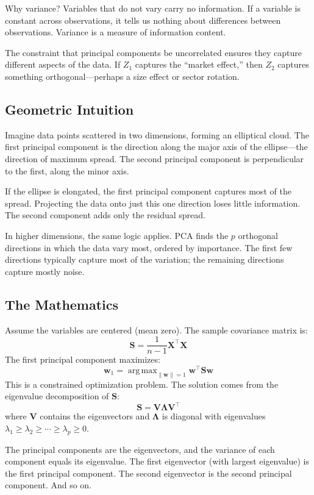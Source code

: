 \documentclass[11pt,a4paper]{article}
\DeclareMathOperator*{\argmax}{arg\,max}
\begin{document}
Why variance? Variables that do not vary carry no information. If a variable is constant across observations, it tells us nothing about differences between observations. Variance is a measure of information content.

The constraint that principal components be uncorrelated ensures they capture different aspects of the data. If $Z_1$ captures the ``market effect,'' then $Z_2$ captures something orthogonal---perhaps a size effect or sector rotation.

\subsection{Geometric Intuition}

Imagine data points scattered in two dimensions, forming an elliptical cloud. The first principal component is the direction along the major axis of the ellipse---the direction of maximum spread. The second principal component is perpendicular to the first, along the minor axis.

If the ellipse is elongated, the first principal component captures most of the spread. Projecting the data onto just this one direction loses little information. The second component adds only the residual spread.

In higher dimensions, the same logic applies. PCA finds the $p$ orthogonal directions in which the data vary most, ordered by importance. The first few directions typically capture most of the variation; the remaining directions capture mostly noise.

\subsection{The Mathematics}

Assume the variables are centered (mean zero). The sample covariance matrix is:
\[
\mathbf{S} = \frac{1}{n-1} \mathbf{X}^\top \mathbf{X}
\]
The first principal component maximizes:
\[
\mathbf{w}_1 = \argmax_{\|\mathbf{w}\|=1} \mathbf{w}^\top \mathbf{S} \mathbf{w}
\]
This is a constrained optimization problem. The solution comes from the eigenvalue decomposition of $\mathbf{S}$:
\[
\mathbf{S} = \mathbf{V} \boldsymbol{\Lambda} \mathbf{V}^\top
\]
where $\mathbf{V}$ contains the eigenvectors and $\boldsymbol{\Lambda}$ is diagonal with eigenvalues $\lambda_1 \geq \lambda_2 \geq \cdots \geq \lambda_p \geq 0$.

The principal components are the eigenvectors, and the variance of each component equals its eigenvalue. The first eigenvector (with largest eigenvalue) is the first principal component. The second eigenvector is the second principal component. And so on.
\end{document}
